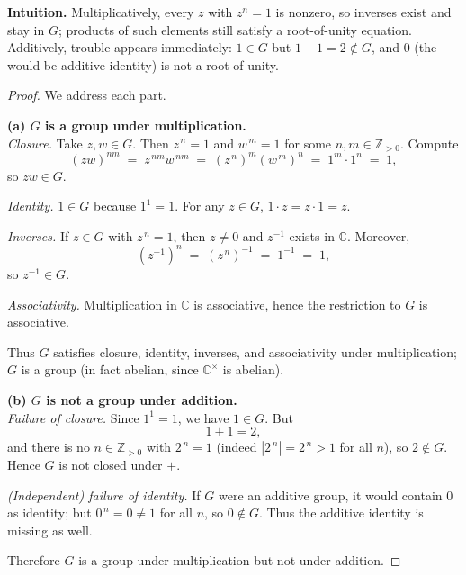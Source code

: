 \documentclass[12pt]{article}
\theoremstyle{definition}
\begin{document}
\dotfill

\noindent
\textbf{Intuition.}
Multiplicatively, every $z$ with $z^n=1$ is nonzero, so inverses exist and stay in $G$; products of such elements
still satisfy a root-of-unity equation. Additively, trouble appears immediately: $1\in G$ but $1+1=2\notin G$,
and $0$ (the would-be additive identity) is not a root of unity.

\dotfill

\begin{proof}
We address each part.

\dotfill

\noindent\textbf{(a) $G$ is a group under multiplication.}\\

\noindent
\emph{Closure.}
Take $z,w\in G$. Then $z^{\,n}=1$ and $w^{\,m}=1$ for some $n,m\in\mathbb{Z}_{>0}$.
Compute
\[
(zw)^{nm} \;=\; z^{\,nm}w^{\,nm} \;=\; (z^{\,n})^{m}(w^{\,m})^{n} \;=\; 1^{m}\cdot 1^{n} \;=\; 1,
\]
so $zw\in G$.

\noindent
\emph{Identity.}
$1\in G$ because $1^{1}=1$. For any $z\in G$, $1\cdot z=z\cdot 1=z$.

\noindent
\emph{Inverses.}
If $z\in G$ with $z^{\,n}=1$, then $z\neq 0$ and $z^{-1}$ exists in $\mathbb{C}$. Moreover,
\[
(z^{-1})^{n} \;=\; (z^{\,n})^{-1} \;=\; 1^{-1} \;=\; 1,
\]
so $z^{-1}\in G$.

\noindent
\emph{Associativity.}
Multiplication in $\mathbb{C}$ is associative, hence the restriction to $G$ is associative.

\noindent
Thus $G$ satisfies closure, identity, inverses, and associativity under multiplication; $G$ is a group
(in fact abelian, since $\mathbb{C}^\times$ is abelian).

\dotfill

\noindent\textbf{(b) $G$ is not a group under addition.}\\

\noindent
\emph{Failure of closure.}
Since $1^{1}=1$, we have $1\in G$. But
\[
1+1=2,
\]
and there is no $n\in\mathbb{Z}_{>0}$ with $2^{\,n}=1$ (indeed $|2^{\,n}|=2^{\,n}>1$ for all $n$), so $2\notin G$.
Hence $G$ is not closed under $+$.

\noindent
\emph{(Independent) failure of identity.}
If $G$ were an additive group, it would contain $0$ as identity; but $0^{\,n}=0\neq 1$ for all $n$,
so $0\notin G$. Thus the additive identity is missing as well.

\dotfill

\noindent
Therefore $G$ is a group under multiplication but not under addition.
\end{proof}
\end{document}
